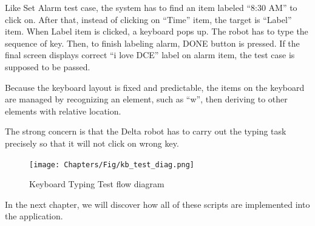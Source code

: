 Like Set Alarm test case, the system has to find an item labeled ``8:30 AM'' to click on. After that, instead of clicking on ``Time'' item, the target is ``Label'' item. When Label item is clicked, a keyboard pops up. The robot has to type the sequence of key. Then, to finish labeling alarm, DONE button is pressed. If the final screen displays correct ``i love DCE'' label on alarm item, the test case is supposed to be passed.

Because the keyboard layout is fixed and predictable, the items on the keyboard are managed by recognizing an element, such as ``w'', then deriving to other elements with relative location.

The strong concern is that the Delta robot has to carry out the typing task precisely so that it will not click on wrong key.

	\begin{figure}[H]
		\centering
		\texttt{[image: Chapters/Fig/kb\_test\_diag.png]}
		\caption{Keyboard Typing Test flow diagram}
		\label{fig:kb_test_diag}
	\end{figure}

In the next chapter, we will discover how all of these scripts are implemented into the application.

